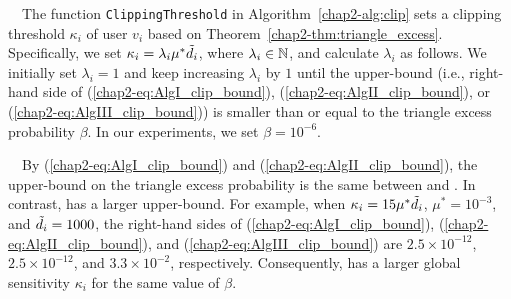 \smallskip
{}~~The function \texttt{ClippingThreshold} in Algorithm~\ref{chap2-alg:clip} sets a clipping threshold $\kappa_i$ of user $v_i$ based on Theorem~\ref{chap2-thm:triangle_excess}. 
Specifically, we set $\kappa_i = \lambda_i \mu^* \tilde{d}_i$, where $\lambda_i \in \mathbb{N}$, and calculate $\lambda_i$ as follows. 
We initially set $\lambda_i = 1$ and keep increasing $\lambda_i$ by $1$ 
until the upper-bound (i.e., right-hand side of (\ref{chap2-eq:AlgI_clip_bound}), (\ref{chap2-eq:AlgII_clip_bound}), or (\ref{chap2-eq:AlgIII_clip_bound})) is smaller than or equal to the triangle excess probability $\beta$. 
In our experiments, we set $\beta = 10^{-6}$. 

\smallskip
{}~~By 
(\ref{chap2-eq:AlgI_clip_bound}) and (\ref{chap2-eq:AlgII_clip_bound}), the upper-bound on the triangle excess probability is the same between \AlgOne{} and \AlgTwo{}. 
In contrast, 
\AlgThree{} has a larger upper-bound. 
For example, 
when $\kappa_i = 15 \mu^* \tilde{d}_i$, $\mu^* = 10^{-3}$, and $\tilde{d}_i=1000$, 
the right-hand sides of (\ref{chap2-eq:AlgI_clip_bound}), (\ref{chap2-eq:AlgII_clip_bound}), and (\ref{chap2-eq:AlgIII_clip_bound}) are $2.5 \times 10^{-12}$, $2.5 \times 10^{-12}$, and $3.3 \times 10^{-2}$, respectively. 
Consequently, \AlgThree{} has a larger global sensitivity $\kappa_i$ for the same value of $\beta$.

